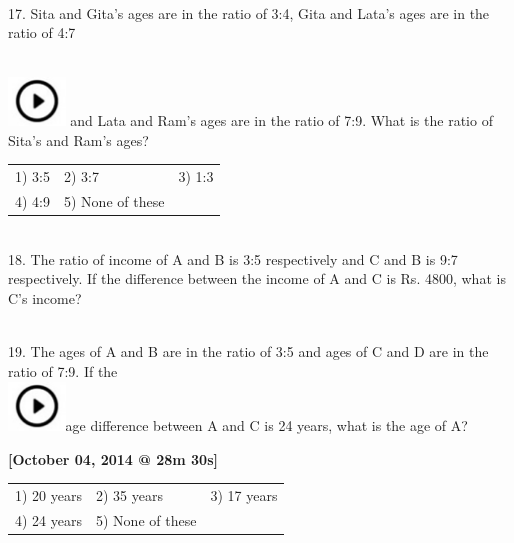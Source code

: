 \documentclass{article}
\begin{document}
	\noindent 
	
	\noindent 
	
	\noindent \\   17. Sita and Gita's ages are in the ratio of 3:4, Gita and Lata's ages are in the ratio of 4:7
	
	\noindent  
	\noindent \\ \includegraphics*[width=0.60in, height=0.52in]{images/image1} and Lata and Ram's ages are in the ratio of 7:9. What is the ratio of Sita's and Ram's ages?
	
	\noindent 
	
	\noindent \begin{tabular}{p{1.7in} p{1.6in} p{1.6in}} \\ 
 1) 3:5                       &  2) 3:7                &  3) 1:3                \\
4) 4:9                & 5) None of these  \\
\end{tabular}
	
	\noindent 
	
	\noindent 
	
	\noindent  \\  
	
	18. The ratio of income of A and B is 3:5 respectively and C and B is 9:7 respectively. If the  difference between the income of A and C is Rs. 4800, what is C's income?
	
	\noindent 
	
	\noindent 
	
	\noindent  \\  
	
	
	
	19. The ages of A and B are in the ratio of 3:5 and ages of C and D are in the ratio of 7:9. If the  
	\noindent \\ \includegraphics*[width=0.60in, height=0.52in]{images/image1}age difference between A and C is 24 years, what is the age of A?
	
	\noindent \textbf{[October 04, 2014 @ 28m 30s]}
	
	\noindent 
	
	\noindent \begin{tabular}{p{1.7in} p{1.6in} p{1.6in}} \\ 
 1) 20 years             &  2) 35 years       &  3) 17 years       \\
4) 24 years       & 5) None of these  \\
\end{tabular}
	
\end{document}
